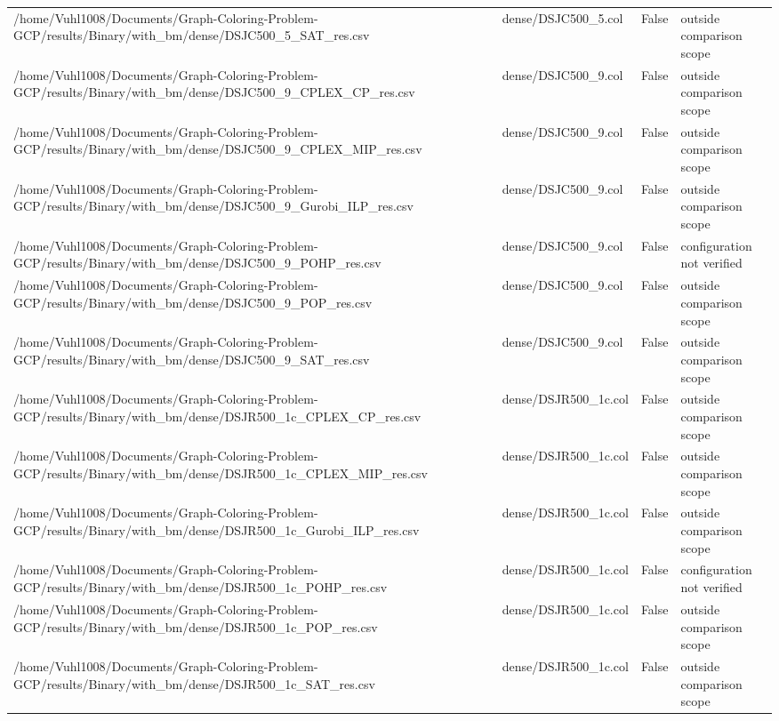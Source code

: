 \begin{table}[htbp]
\begin{tabular}{llll}
/home/Vuhl1008/Documents/Graph-Coloring-Problem-GCP/results/Binary/with\_bm/dense/DSJC500\_5\_SAT\_res.csv & dense/DSJC500\_5.col & False & outside comparison scope \\
/home/Vuhl1008/Documents/Graph-Coloring-Problem-GCP/results/Binary/with\_bm/dense/DSJC500\_9\_CPLEX\_CP\_res.csv & dense/DSJC500\_9.col & False & outside comparison scope \\
/home/Vuhl1008/Documents/Graph-Coloring-Problem-GCP/results/Binary/with\_bm/dense/DSJC500\_9\_CPLEX\_MIP\_res.csv & dense/DSJC500\_9.col & False & outside comparison scope \\
/home/Vuhl1008/Documents/Graph-Coloring-Problem-GCP/results/Binary/with\_bm/dense/DSJC500\_9\_Gurobi\_ILP\_res.csv & dense/DSJC500\_9.col & False & outside comparison scope \\
/home/Vuhl1008/Documents/Graph-Coloring-Problem-GCP/results/Binary/with\_bm/dense/DSJC500\_9\_POHP\_res.csv & dense/DSJC500\_9.col & False & configuration not verified \\
/home/Vuhl1008/Documents/Graph-Coloring-Problem-GCP/results/Binary/with\_bm/dense/DSJC500\_9\_POP\_res.csv & dense/DSJC500\_9.col & False & outside comparison scope \\
/home/Vuhl1008/Documents/Graph-Coloring-Problem-GCP/results/Binary/with\_bm/dense/DSJC500\_9\_SAT\_res.csv & dense/DSJC500\_9.col & False & outside comparison scope \\
/home/Vuhl1008/Documents/Graph-Coloring-Problem-GCP/results/Binary/with\_bm/dense/DSJR500\_1c\_CPLEX\_CP\_res.csv & dense/DSJR500\_1c.col & False & outside comparison scope \\
/home/Vuhl1008/Documents/Graph-Coloring-Problem-GCP/results/Binary/with\_bm/dense/DSJR500\_1c\_CPLEX\_MIP\_res.csv & dense/DSJR500\_1c.col & False & outside comparison scope \\
/home/Vuhl1008/Documents/Graph-Coloring-Problem-GCP/results/Binary/with\_bm/dense/DSJR500\_1c\_Gurobi\_ILP\_res.csv & dense/DSJR500\_1c.col & False & outside comparison scope \\
/home/Vuhl1008/Documents/Graph-Coloring-Problem-GCP/results/Binary/with\_bm/dense/DSJR500\_1c\_POHP\_res.csv & dense/DSJR500\_1c.col & False & configuration not verified \\
/home/Vuhl1008/Documents/Graph-Coloring-Problem-GCP/results/Binary/with\_bm/dense/DSJR500\_1c\_POP\_res.csv & dense/DSJR500\_1c.col & False & outside comparison scope \\
/home/Vuhl1008/Documents/Graph-Coloring-Problem-GCP/results/Binary/with\_bm/dense/DSJR500\_1c\_SAT\_res.csv & dense/DSJR500\_1c.col & False & outside comparison scope \\

\end{tabular}
\end{table}
